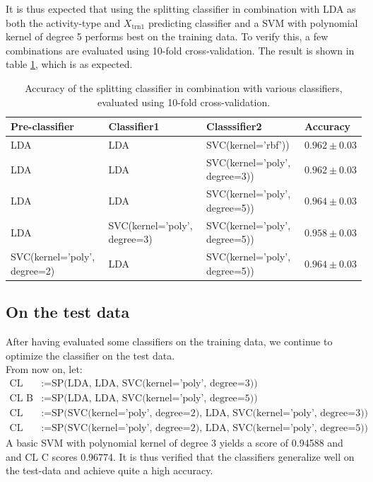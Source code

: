 \documentclass [a4paper] {report}
\begin{document}
	\noindent
	It is thus expected that using the splitting classifier in combination with LDA as both the activity-type and $X_{\text{trn1}}$ predicting classifier and a SVM with polynomial kernel of degree 5 performs best on the training data. To verify this, a few combinations are evaluated using 10-fold cross-validation. The result is shown in table \ref{tab:Xtrn_final}, which is as expected.
	
	\begin{table}[H]
		\centering
		\caption{Accuracy of the splitting classifier in combination with various classifiers, evaluated using 10-fold cross-validation.}
		\label{tab:Xtrn_final}
		\begin{tabular}{l|l|l|l}
			Pre-classifier 					& Classifier1 					&  Classsifier2								& Accuracy  \\ \hline
			LDA 							& LDA							& SVC(kernel='rbf')) 						& $0.962 \pm 0.03 $\\
			LDA 							& LDA							& SVC(kernel='poly', degree=3)) 			& $0.962 \pm 0.03 $\\
			LDA 							& LDA							& SVC(kernel='poly', degree=5)) 			& $0.964 \pm 0.03 $\\
			LDA 							& SVC(kernel='poly', degree=3)	& SVC(kernel='poly', degree=5)) 			& $0.958 \pm 0.03 $\\
			SVC(kernel='poly', degree=2) 	& LDA							& SVC(kernel='poly', degree=5)) 			& $0.964 \pm 0.03 $\\
		\end{tabular}		
	\end{table}
	
	
	\subsection*{On the test data}
	After having evaluated some classifiers on the training data, we continue to optimize the classifier on the test data. \\
	From now on, let:
	\begin{align*}
		\text{CL A} &:= \text{SP(LDA, LDA, SVC(kernel='poly', degree=3))}\\
		\text{CL B} &:= \text{SP(LDA, LDA, SVC(kernel='poly', degree=5))}\\
		\text{CL C} &:= \text{SP(SVC(kernel='poly', degree=2), LDA, SVC(kernel='poly', degree=3))}\\
		\text{CL D} &:= \text{SP(SVC(kernel='poly', degree=2), LDA, SVC(kernel='poly', degree=5))}
	\end{align*}
	A basic SVM with polynomial kernel of degree 3 yields a score of 0.94588 and and $\text{CL C}$ scores 0.96774. It is thus verified that the classifiers generalize well on the test-data and achieve quite a high accuracy. \\
	
\end{document}
